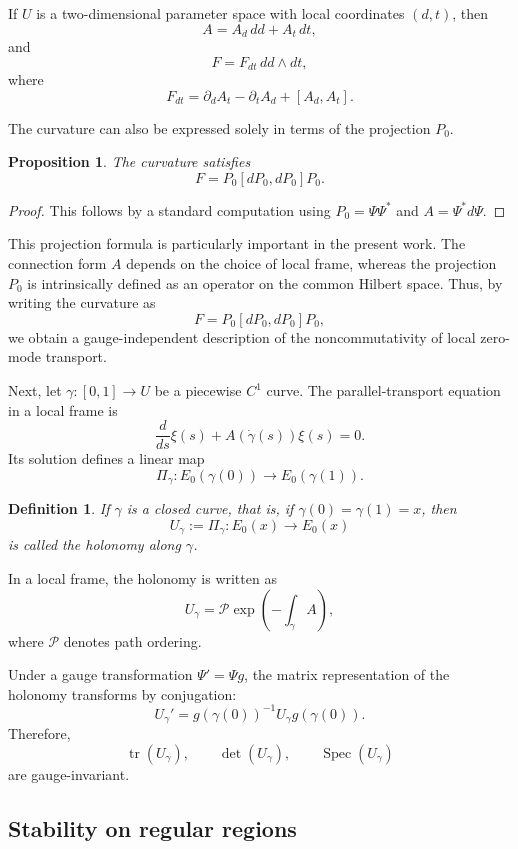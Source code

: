 \documentclass[10pt,a4paper]{amsart}
\newtheorem{proposition}[theorem]{Proposition}%
\newtheorem{definition}{Definition}%
\begin{document}
If \(U\) is a two-dimensional parameter space with local coordinates \((d,t)\), then
\[
A=A_d\,dd+A_t\,dt,
\]
and
\[
F=F_{dt}\,dd\wedge dt,
\]
where
\[
F_{dt}
=
\partial_dA_t-\partial_tA_d+[A_d,A_t].
\]

The curvature can also be expressed solely in terms of the projection \(P_0\).

\begin{proposition}
The curvature satisfies
\[
F=P_0[dP_0,dP_0]P_0.
\]
\end{proposition}

\begin{proof}
This follows by a standard computation using \(P_0=\Psi\Psi^\ast\) and \(A=\Psi^\ast d\Psi\).
\end{proof}

This projection formula is particularly important in the present work. The connection form \(A\) depends on the choice of local frame, whereas the projection \(P_0\) is intrinsically defined as an operator on the common Hilbert space. Thus, by writing the curvature as
\[
F=P_0[dP_0,dP_0]P_0,
\]
we obtain a gauge-independent description of the noncommutativity of local zero-mode transport.

Next, let \(\gamma:[0,1]\to U\) be a piecewise \(C^1\) curve. The parallel-transport equation in a local frame is
\[
\frac{d}{ds}\xi(s)
+
A(\dot\gamma(s))\xi(s)
=
0.
\]
Its solution defines a linear map
\[
\Pi_\gamma:E_0(\gamma(0))\to E_0(\gamma(1)).
\]

\begin{definition}
If \(\gamma\) is a closed curve, that is, if \(\gamma(0)=\gamma(1)=x\), then
\[
U_\gamma:=\Pi_\gamma:E_0(x)\to E_0(x)
\]
is called the holonomy along \(\gamma\).
\end{definition}

In a local frame, the holonomy is written as
\[
U_\gamma
=
\mathcal{P}\exp\left(-\int_\gamma A\right),
\]
where \(\mathcal{P}\) denotes path ordering.

Under a gauge transformation \(\Psi'=\Psi g\), the matrix representation of the holonomy transforms by conjugation:
\[
U_\gamma'
=
g(\gamma(0))^{-1}U_\gamma g(\gamma(0)).
\]
Therefore,
\[
\operatorname{tr}(U_\gamma),
\qquad
\det(U_\gamma),
\qquad
\operatorname{Spec}(U_\gamma)
\]
are gauge-invariant.

\subsection{Stability on regular regions}
\end{document}
